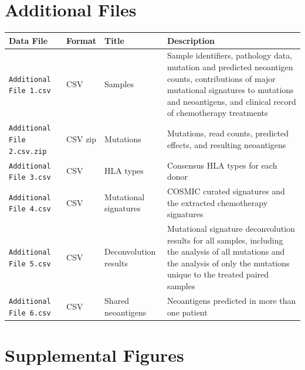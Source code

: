 
\section*{Additional Files}

\setcounter{equation}{0}
\setcounter{figure}{0}
\setcounter{table}{0}
\makeatletter
\renewcommand{\theequation}{S\arabic{equation}}
\renewcommand{\thefigure}{S\arabic{figure}}

\begin{center}
    \begin{tabular}{ | l | l | l | p{5cm} |}
    \hline
    \textbf{Data File} & \textbf{Format} & \textbf{Title} & \textbf{Description} \\ \hline
    \texttt{Additional File 1.csv} & CSV & Samples & Sample identifiers, pathology data, mutation and predicted neoantigen counts, contributions of major mutational signatures to mutations and neoantigens, and clinical record of chemotherapy treatments \\ \hline

    \texttt{Additional File 2.csv.zip} & CSV zip & Mutations & Mutations, read counts, predicted effects, and resulting neoantigens \\ \hline
    
    \texttt{Additional File 3.csv} & CSV & HLA types & Consensus HLA types for each donor \\ \hline
    
    \texttt{Additional File 4.csv} & CSV & Mutational signatures & COSMIC curated signatures and the extracted chemotherapy signatures \\ \hline

    \texttt{Additional File 5.csv} & CSV & Deconvolution results & Mutational signature deconvolution results for all samples, including the analysis of all mutations and the analysis of only the mutations unique to the treated paired samples  \\ \hline
    
    \texttt{Additional File 6.csv} & CSV & Shared neoantigens & Neoantigens predicted in more than one patient  \\ \hline
    \end{tabular}
\end{center}


\section*{Supplemental Figures}

